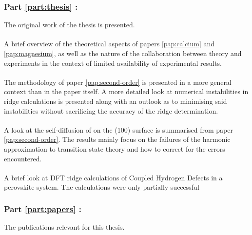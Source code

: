 \subsubsection{Part \ref{part:thesis} : }
The original work of the thesis is presented.

\paragraph{}
A brief overview of the theoretical aspects of papers \ref{pap:calcium} and \ref{pap:magnesium}, as well as the nature of the collaboration between theory and experiments in the context of limited availability of experimental results.

\paragraph{}
The methodology of paper \ref{pap:second-order} is presented in a more general context than in the paper itself.
A more detailed look at numerical instabilities in ridge calculations is presented along with an outlook as to minimising said instabilities without sacrificing the accuracy of the ridge determination.

\paragraph{}
A look at the self-diffusion of  on the (100) surface is summarised from paper \ref{pap:second-order}.
The results mainly focus on the failures of the harmonic approximation to transition state theory and how to correct for the errors encountered.

\paragraph{}
A brief look at DFT ridge calculations of Coupled Hydrogen Defects in a  perovskite system.
The calculations were only partially successful \expand

\subsubsection{Part \ref{part:papers} : }
The publications relevant for this thesis.
